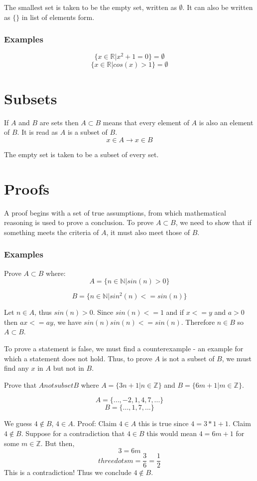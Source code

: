 \documentclass[12pt]{report}
\begin{document}
\begin{flushleft}
{The smallest set is taken to be the empty set, written as \(\emptyset\). It can also be written as 
\(\{\}\) in list of elements form.

\subsubsection*{Examples}
\[\{x \in \mathbb{R} | x^2 + 1 = 0\} = \emptyset\]
\[\{x \in \mathbb{R} | cos(x) > 1\} = \emptyset\]

\section*{Subsets}
If \(A\) and \(B\) are sets then \(A \subset B\) means that every element of \(A\) is also an element
of \(B\). It is read as \(A\) is a subset of \(B\).
\[x \in A \rightarrow x \in B\]

The empty set is taken to be a subset of every set.

\section*{Proofs}
A proof begins with a set of true assumptions, from which mathematical reasoning is used
to prove a conclusion.
To prove \(A \subset B\), we need to show that if something meets the criteria of \(A\),
it must also meet those of \(B\).

\subsubsection*{Examples}
Prove \(A \subset B\) where:
\[A = \{n \in \mathbb{N} | sin(n) > 0\}\]
\par
\[B = \{n \in \mathbb{N} | sin^2(n) <= sin(n)\}\]
\par
Let \(n \in A\), thus \(sin(n) > 0\). Since \(sin(n) <= 1\) and if \(x <= y\) and 
\(a > 0\) then \(ax <= ay\), we have \(sin(n)sin(n)<=sin(n)\).
Therefore \(n \in B\) so \(A \subset B\).
\par
To prove a statement is false, we must find a counterexample - an example for which a
statement does not hold. Thus, to prove \(A\) is not a subset of \(B\), we must find any
\(x\) in \(A\) but not in \(B\).

Prove that \(A notsubset B\) where \(A = \{3n + 1 | n \in \mathbb{Z}\}\) and \(B = \{6m + 1 | m \in \mathbb{Z}\}\).
\par
\[A = \{..., -2, 1, 4, 7, ...\}\]
\[B = \{..., 1, 7, ...\}\]
\par
We guess \(4 \notin B\), \(4 \in A\).
Proof: Claim \(4 \in A\) this is true since \(4 = 3*1 + 1\). Claim \(4 \notin B\). Suppose for a
contradiction that \(4 \in B\) this would mean \(4 = 6m + 1\) for some \(m \in \mathbb{Z}\).
But then, 
\[3 = 6m\]
\[threedots m = \frac{3}{6} = \frac{1}{2}\]
This is a contradiction! Thus we conclude \(4 \notin B\).


}
\end{flushleft}
\end{document}
